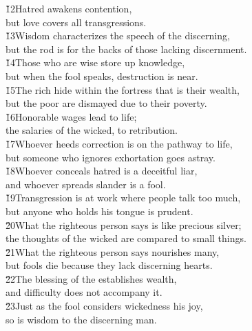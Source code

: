\begin{poetry}
\poeml \v{12}Hatred awakens contention, \\
\poemll    but love covers all transgressions. \\
\poeml \v{13}Wisdom characterizes the speech of the discerning, \\
\poemll    but the rod is for the backs of those lacking discernment. \\
\poeml \v{14}Those who are wise store up knowledge, \\
\poemll    but when the fool speaks, destruction is near. \\
\poeml \v{15}The rich hide within the fortress that is their wealth, \\
\poemll    but the poor are dismayed due to their poverty. \\
\poeml \v{16}Honorable wages lead to life; \\
\poemll    the salaries of the wicked, to retribution. \\
\poeml \v{17}Whoever heeds correction is on the pathway to life, \\
\poemll    but someone who ignores exhortation goes astray. \\
\poeml \v{18}Whoever conceals hatred is a deceitful liar, \\
\poemll    and whoever spreads slander is a fool. \\
\poeml \v{19}Transgression is at work where people talk too much, \\
\poemll    but anyone who holds his tongue is prudent. \\
\poeml \v{20}What the righteous person says is like precious silver; \\
\poemll    the thoughts of the wicked are compared to small things. \\
\poeml \v{21}What the righteous person says nourishes many, \\
\poemll    but fools die because they lack discerning hearts. \\
\poeml \v{22}The blessing of the  establishes wealth, \\
\poemll    and difficulty does not accompany it. \\
\poeml \v{23}Just as the fool considers wickedness his joy, \\
\poemll    so is wisdom to the discerning man. \\

\end{poetry}
